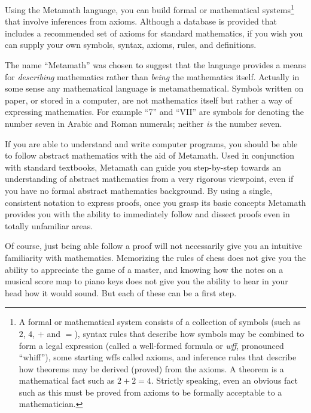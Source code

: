 
Using the Metamath language, you can build formal or mathematical
systems\footnote{A formal or mathematical system consists
of a collection of symbols (such as $2$, $4$, $+$ and $=$), syntax rules that
describe how symbols may be combined to form a legal expression (called a
well-formed formula or {\em wff}, pronounced ``whiff''), some starting wffs
called axioms, and inference rules that describe how theorems may be derived
(proved) from the axioms.  A theorem is a mathematical fact such as $2+2=4$.
Strictly speaking, even an obvious fact such as this must be proved from
axioms to be formally acceptable to a mathematician.}
 that involve
inferences from axioms.  Although a database is provided
that includes a recommended set of axioms for standard mathematics, if you
wish you can supply your own symbols, syntax, axioms, rules, and definitions.

The name ``Metamath'' was chosen to suggest that the language provides a
means for {\em describing} mathematics rather than {\em being} the
mathematics itself.  Actually in some sense any mathematical language is
metamathematical.  Symbols written on paper, or stored in a computer,
are not mathematics itself but rather a way of expressing mathematics.
For example ``7'' and ``VII'' are symbols for denoting the number seven
in Arabic and Roman numerals; neither {\em is} the number seven.

If you are able to understand and write computer programs, you should be able
to follow abstract mathematics with the aid of Metamath.  Used in conjunction
with standard textbooks, Metamath can guide you step-by-step towards an
understanding of abstract mathematics from a very rigorous viewpoint, even if
you have no formal abstract mathematics background.  By using a single,
consistent notation to express proofs, once you grasp its basic concepts
Metamath provides you with the ability to immediately follow and dissect
proofs even in totally unfamiliar areas.

Of course, just being able follow a proof will not necessarily give you an
intuitive familiarity with mathematics.  Memorizing the rules of chess does not
give you the ability to appreciate the game of a master, and knowing how the
notes on a musical score map to piano keys does not give you the ability to
hear in your head how it would sound.  But each of these can be a first step.

